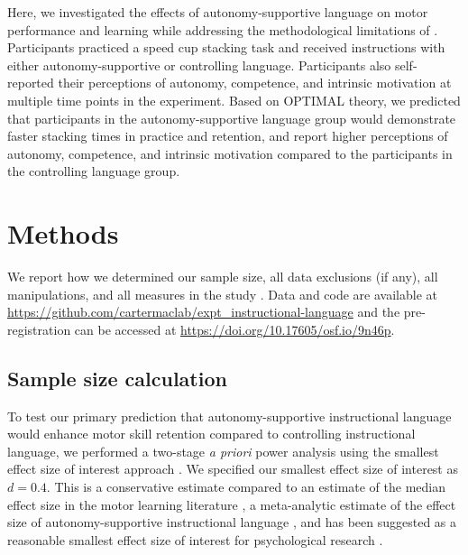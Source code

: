 \documentclass[man,floatsintext,donotrepeattitle,letterpaper,12pt]{apa7}
\begin{document}
Here, we investigated the effects of autonomy-supportive language on motor performance and learning while addressing the methodological limitations of \textcite{hooyman2014}. Participants practiced a speed cup stacking task and received instructions with either autonomy-supportive or controlling language. Participants also self-reported their perceptions of autonomy, competence, and intrinsic motivation at multiple time points in the experiment. Based on OPTIMAL theory, we predicted that participants in the autonomy-supportive language group would demonstrate faster stacking times in practice and retention, and report higher perceptions of autonomy, competence, and intrinsic motivation compared to the participants in the controlling language group.

\section{Methods}

We report how we determined our sample size, all data exclusions (if any), all manipulations, and all measures in the study \autocite{simmons2012}. Data and code are available at \url{https://github.com/cartermaclab/expt_instructional-language} and the pre-registration can be accessed at \url{https://doi.org/10.17605/osf.io/9n46p}.

\subsection{Sample size calculation}

To test our primary prediction that autonomy-supportive instructional language would enhance motor skill retention compared to controlling instructional language, we performed a two-stage \emph{a priori} power analysis using the smallest effect size of interest approach \autocite[see][for a discussion]{lakens2022}. We specified our smallest effect size of interest as $d = 0.4$. This is a conservative estimate compared to an estimate of the median effect size in the motor learning literature \autocite[$d = 0.63$ in][]{lohse2016}, a meta-analytic estimate of the effect size of autonomy-supportive instructional language \autocite[$d = 0.63$,][]{su2011}, and has been suggested as a reasonable smallest effect size of interest for psychological research \autocite{brysbaert2019}.
\end{document}
